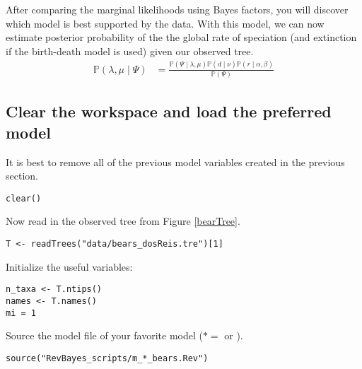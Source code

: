 After comparing the marginal likelihoods using Bayes factors, you will discover which model is best supported by the data. 
With this model, we can now estimate posterior probability of the the global rate of speciation (and extinction if the birth-death model is used) given our observed tree.
\begin{align}\label{bayesTher2}
\mathbb{P}(\lambda, \mu \mid \Psi) &= \frac{\mathbb{P}(\Psi \mid \lambda, \mu)\mathbb{P}(d \mid \nu)\mathbb{P}(r \mid \alpha, \beta)}{\mathbb{P}(\Psi)}
\end{align}




\subsection{Clear the workspace and load the preferred model}

It is best to remove all of the previous model variables created in the previous section.
{\tt \begin{snugshade*}
\begin{lstlisting}
clear()
\end{lstlisting}
\end{snugshade*}}


Now read in the observed tree from Figure \ref{bearTree}. 
{\tt \begin{snugshade*}
\begin{lstlisting}
T <- readTrees("data/bears_dosReis.tre")[1]
\end{lstlisting}
\end{snugshade*}}

Initialize the useful variables:
{\tt \begin{snugshade*}
\begin{lstlisting}
n_taxa <- T.ntips()
names <- T.names()
mi = 1 
\end{lstlisting}
\end{snugshade*}}



Source the model file of your favorite model ($* = $  or ).
{\tt \begin{snugshade*}
\begin{lstlisting}
source("RevBayes_scripts/m_*_bears.Rev")
\end{lstlisting}
\end{snugshade*}}

